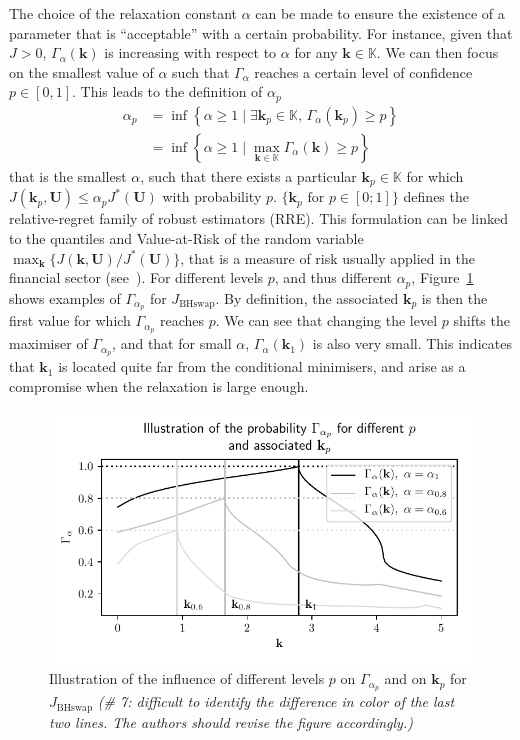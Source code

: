 \documentclass[preprint, review, 1p]{elsarticle}
\newcommand{\RRE}{RRE}
\newcommand{\checkap}{{\alpha}_p}
\newcommand{\checkkp}{{\mathbf{k}}_p}
\newcommand{\Kspace}{\mathbb{K}}
\newcommand{\JBHS}{J_{\mathrm{BHswap}}}
\newcommand{\victor}[1]{{\itshape\color{green} ({#1})}}
\newlength{\singlecolumnsize}
\begin{document}
The choice of the relaxation constant $\alpha$ can be made to ensure the existence of a parameter that is ``acceptable'' with a certain probability.
For instance, given that $J>0$, $\Gamma_{\alpha}(\mathbf{k})$ is increasing with respect to $\alpha$ for any $\mathbf{k}\in\Kspace$. We can then focus on the smallest value of $\alpha$ such that $\Gamma_\alpha$ reaches a certain level of confidence $p\in[0,1]$. This leads to the definition of $\checkap$
\begin{align}
  \checkap &= \inf\left\{ \alpha\geq 1 \mid \exists \checkkp \in \Kspace,\, \Gamma_{\alpha}(\checkkp) \geq p \right\} \nonumber \\
   &= \inf \left\{ \alpha \geq 1 \mid \max_{\mathbf{k}\in\Kspace} \Gamma_{\alpha}(\mathbf{k}) \geq p \right\}   \label{eq:def_alpha_check}
\end{align}
that is the smallest $\alpha$, such that there exists a particular $\checkkp \in \Kspace$ for which $J(\checkkp,\mathbf{U}) \leq \checkap J^*(\mathbf{U})$ with probability $p$.
$\{\mathbf{k}_p \text{ for } p \in [0;1] \}$ defines the relative-regret family of robust estimators (\RRE).
This formulation can be linked to the quantiles and Value-at-Risk of the random variable $\max_{\mathbf{k}} \{ J(\mathbf{k},\mathbf{U}) / J^*(\mathbf{U})\}$, that is a measure of risk usually applied in the financial sector (see~\cite{rockafellar_deviation_2002}). For different levels $p$, and thus different $\alpha_p$, Figure~\ref{fig:illu_alpha_p} shows examples of $\Gamma_{\alpha_p}$ for $\JBHS$. By definition, the associated $\mathbf{k}_p$ is then the first value for which $\Gamma_{\alpha_p}$ reaches $p$. We can see that changing the level $p$ shifts the maximiser of $\Gamma_{\alpha_p}$, and that for small $\alpha$, $\Gamma_{\alpha}(\mathbf{k}_1)$ is also very small. This indicates that $\mathbf{k}_1$ is located quite far from the conditional minimisers, and arise as a compromise when the relaxation is large enough.

\begin{figure}[!ht]
\centering
\includegraphics[width = \singlecolumnsize]{Figures/FIG04.pdf}
\caption{Illustration of the influence of different levels $p$ on $\Gamma_{\alpha_p}$ and on $\mathbf{k}_p$ for $\JBHS$ \victor{\# 7: difficult to identify the difference in color of the last two lines. The authors should revise the figure accordingly.}
}
\label{fig:illu_alpha_p}
\end{figure}
\end{document}
